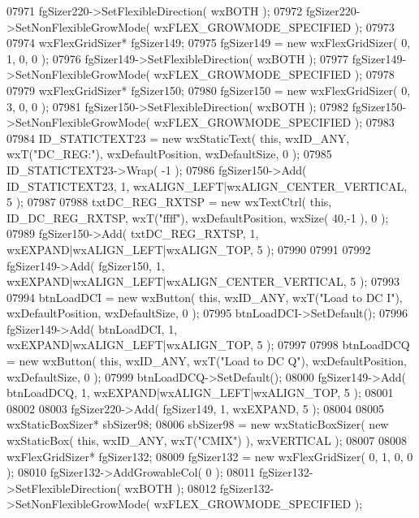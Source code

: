 \begin{DoxyCode}
07971     fgSizer220->SetFlexibleDirection( wxBOTH );
07972     fgSizer220->SetNonFlexibleGrowMode( wxFLEX\_GROWMODE\_SPECIFIED );
07973     
07974     wxFlexGridSizer* fgSizer149;
07975     fgSizer149 = \textcolor{keyword}{new} wxFlexGridSizer( 0, 1, 0, 0 );
07976     fgSizer149->SetFlexibleDirection( wxBOTH );
07977     fgSizer149->SetNonFlexibleGrowMode( wxFLEX\_GROWMODE\_SPECIFIED );
07978     
07979     wxFlexGridSizer* fgSizer150;
07980     fgSizer150 = \textcolor{keyword}{new} wxFlexGridSizer( 0, 3, 0, 0 );
07981     fgSizer150->SetFlexibleDirection( wxBOTH );
07982     fgSizer150->SetNonFlexibleGrowMode( wxFLEX\_GROWMODE\_SPECIFIED );
07983     
07984     ID_STATICTEXT23 = \textcolor{keyword}{new} wxStaticText( \textcolor{keyword}{this}, wxID\_ANY, wxT(\textcolor{stringliteral}{"DC\_REG:"}), wxDefaultPosition, wxDefaultSize, 0
       );
07985     ID_STATICTEXT23->Wrap( -1 );
07986     fgSizer150->Add( ID_STATICTEXT23, 1, wxALIGN\_LEFT|wxALIGN\_CENTER\_VERTICAL, 5 );
07987     
07988     txtDC_REG_RXTSP = \textcolor{keyword}{new} wxTextCtrl( \textcolor{keyword}{this}, ID_DC_REG_RXTSP, wxT(\textcolor{stringliteral}{"ffff"}), wxDefaultPosition, wxSize( 40,-1 
      ), 0 );
07989     fgSizer150->Add( txtDC_REG_RXTSP, 1, wxEXPAND|wxALIGN\_LEFT|wxALIGN\_TOP, 5 );
07990     
07991     
07992     fgSizer149->Add( fgSizer150, 1, wxEXPAND|wxALIGN\_LEFT|wxALIGN\_CENTER\_VERTICAL, 5 );
07993     
07994     btnLoadDCI = \textcolor{keyword}{new} wxButton( \textcolor{keyword}{this}, wxID\_ANY, wxT(\textcolor{stringliteral}{"Load to DC I"}), wxDefaultPosition, wxDefaultSize, 0 );
07995     btnLoadDCI->SetDefault(); 
07996     fgSizer149->Add( btnLoadDCI, 1, wxEXPAND|wxALIGN\_LEFT|wxALIGN\_TOP, 5 );
07997     
07998     btnLoadDCQ = \textcolor{keyword}{new} wxButton( \textcolor{keyword}{this}, wxID\_ANY, wxT(\textcolor{stringliteral}{"Load to DC Q"}), wxDefaultPosition, wxDefaultSize, 0 );
07999     btnLoadDCQ->SetDefault(); 
08000     fgSizer149->Add( btnLoadDCQ, 1, wxEXPAND|wxALIGN\_LEFT|wxALIGN\_TOP, 5 );
08001     
08002     
08003     fgSizer220->Add( fgSizer149, 1, wxEXPAND, 5 );
08004     
08005     wxStaticBoxSizer* sbSizer98;
08006     sbSizer98 = \textcolor{keyword}{new} wxStaticBoxSizer( \textcolor{keyword}{new} wxStaticBox( \textcolor{keyword}{this}, wxID\_ANY, wxT(\textcolor{stringliteral}{"CMIX"}) ), wxVERTICAL );
08007     
08008     wxFlexGridSizer* fgSizer132;
08009     fgSizer132 = \textcolor{keyword}{new} wxFlexGridSizer( 0, 1, 0, 0 );
08010     fgSizer132->AddGrowableCol( 0 );
08011     fgSizer132->SetFlexibleDirection( wxBOTH );
08012     fgSizer132->SetNonFlexibleGrowMode( wxFLEX\_GROWMODE\_SPECIFIED );

\end{DoxyCode}
